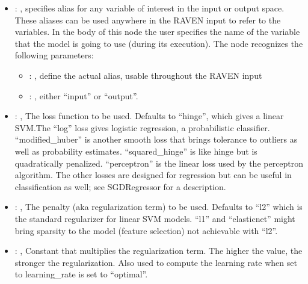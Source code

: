 \begin{itemize}
    \item {}: , 
      specifies alias for         any variable of interest in the input or output space. These
      aliases can be used anywhere in the RAVEN input to         refer to the variables. In the body
      of this node the user specifies the name of the variable that the model is going to use
      (during its execution).
      The  node recognizes the following parameters:
        \begin{itemize}
          \item {}: , 
            define the actual alias, usable throughout the RAVEN input
          \item {}: , 
            either ``input'' or ``output''.
      \end{itemize}

    \item {}: , 
      The loss function to be used. Defaults to ``hinge'', which gives a linear SVM.The ``log'' loss
      gives logistic regression, a                                                  probabilistic
      classifier. ``modified\_huber'' is another smooth loss that brings tolerance to outliers as
      well as probability estimates.
      ``squared\_hinge'' is like hinge but is quadratically penalized. ``perceptron'' is the linear
      loss used by the perceptron algorithm.                                                  The
      other losses are designed for regression but can be useful in classification as well; see
      SGDRegressor for a description.

    \item {}: \xmlDesc{[l2, l1, elasticnet]}, 
      The penalty (aka regularization term) to be used. Defaults to ``l2'' which is the standard
      regularizer for linear SVM models.                                                  ``l1'' and
      ``elasticnet'' might bring sparsity to the model (feature selection) not achievable with
      ``l2''.

    \item {}: , 
      Constant that multiplies the regularization term. The higher the value, the stronger the
      regularization. Also used to compute                                                  the
      learning rate when set to learning\_rate is set to ``optimal''.


\end{itemize}
